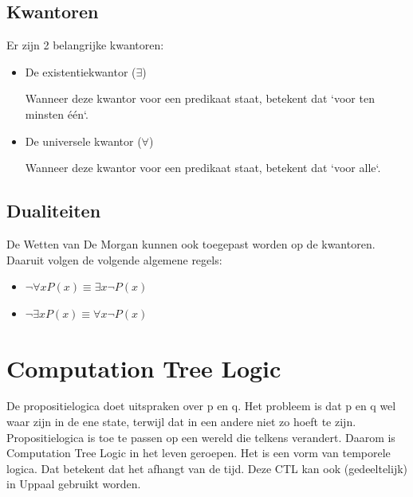 \documentclass{article}
\begin{document}
		\subsection{Kwantoren}
		
		Er zijn 2 belangrijke kwantoren:

		\begin{itemize}
			\item De existentiekwantor (\( \exists \))

			Wanneer deze kwantor voor een predikaat staat, betekent dat `voor ten minsten één`.

			\item De universele kwantor (\( \forall \))

			Wanneer deze kwantor voor een predikaat staat, betekent dat `voor alle`.
		\end{itemize}

		
		\subsection{Dualiteiten}
		
		De Wetten van De Morgan kunnen ook toegepast worden op de kwantoren. Daaruit volgen de volgende algemene regels:

		\begin{itemize}
			\item \( \neg \forall xP(x) \equiv \exists x \neg P(x) \)
			\item \( \neg \exists xP(x) \equiv \forall x \neg P(x) \)
		\end{itemize}
	
	\newpage
	
	
	\section{Computation Tree Logic}
	
	De propositielogica doet uitspraken over p en q. Het probleem is dat p en q wel waar zijn in de ene state, terwijl dat in een andere niet zo hoeft te zijn. Propositielogica is toe te passen op een wereld die telkens verandert. Daarom is Computation Tree Logic in het leven geroepen. Het is een vorm van temporele logica. Dat betekent dat het afhangt van de tijd. Deze CTL kan ook (gedeeltelijk) in Uppaal gebruikt worden.
		
\end{document}
